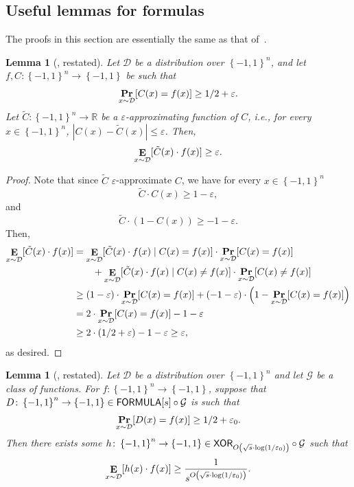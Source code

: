 \documentclass[10pt,a4paper]{article}
\newtheorem{lemma}[theorem]{Lemma}
\DeclareMathOperator*\Exp{{\bf E}}
\DeclareMathOperator*\Prob{{\bf Pr}}
\newcommand{\boolpm}{\left\{-1,1\right\}}
\newcommand{\FORMULA}{{\sf FORMULA}}
\newcommand{\XOR}{{\sf XOR}}
\newcommand{\given}{\mid}
\newcommand{\real}{\mathbb{R}}
\begin{document}
    \subsection{Useful lemmas for formulas}\label{subsec:formula-lemmas}
    
    The proofs in this section are essentially the same as that of~\cite{Tal16}.
    
    \begin{lemma}[\cite{Tal16},  restated]\label{lem:lb-Tal-1-app}
	    Let $\mathcal{D}$ be a distribution over $\boolpm^n$, and let $f,C\colon\boolpm^n\to\boolpm$ be such that
	    \[
	        \Prob_{x\sim\mathcal{D}}[C(x)=f(x)]\geq 1/2+\varepsilon.
	    \] 
	    Let $\tilde{C}\colon\boolpm^n\to\real$ be a $\varepsilon$-approximating function of $C$, i.e., for every $x\in\boolpm^n$, $|C(x)-\tilde{C}(x)|\leq \varepsilon$. Then,
	    \[
	        \Exp_{x\sim\mathcal{D}}[\tilde{C}(x)\cdot f(x)]\geq \varepsilon.
	    \]
	\end{lemma}
	
	\begin{proof}
		Note that since $\tilde{C}$ $\varepsilon$-approximate $C$, we have for every $x\in\boolpm^n$
		\[
			\tilde{C}\cdot C(x)\geq 1-\varepsilon,
		\]
		and 
		\[
			\tilde{C}\cdot (1-C(x))\geq -1-\varepsilon.
		\]
		Then,
		\begin{align*}
			\Exp_{x\sim\mathcal{D}}[\tilde{C}(x)\cdot f(x)]&=\Exp_{x\sim\mathcal{D}}[\tilde{C}(x)\cdot f(x)\given C(x)=f(x)]\cdot\Prob_{x\sim\mathcal{D}}[C(x)=f(x)]\\
			&\qquad+\Exp_{x\sim\mathcal{D}}[\tilde{C}(x)\cdot f(x)\given C(x)\ne f(x)]\cdot\Prob_{x\sim\mathcal{D}}[C(x)\ne f(x)]\\
			&\geq(1-\varepsilon)\cdot \Prob_{x\sim\mathcal{D}}[C(x)=f(x)] + (-1-\varepsilon)\cdot \left(1-\Prob_{x\sim\mathcal{D}}[C(x)=f(x)]\right)\\
			&=2\cdot \Prob_{x\sim\mathcal{D}}[C(x)=f(x)] - 1 -\varepsilon\\
			&\geq 2\cdot (1/2+\varepsilon) - 1 - \varepsilon \geq \varepsilon,
		\end{align*}
		as desired.
	\end{proof}
	
	\begin{lemma}[\cite{Tal16},  restated]\label{lem:lb-Tal-2-app}
	    Let $\mathcal{D}$ be a distribution over $\boolpm^n$ and let $\mathcal{G}$ be a class of functions. For $f\colon\boolpm^n\to\boolpm$, suppose that $D\colon\boolpm^n\to\boolpm\in \FORMULA[s]\circ\mathcal{G}$ is such that 
	    \[
	        \Prob_{x\sim\mathcal{D}}[D(x)=f(x)]\geq 1/2+\varepsilon_0.
	    \]
	    Then there exists some $h\colon\boolpm^n\to\boolpm\in \XOR_{O\left(\sqrt{s}\cdot\log(1/\varepsilon_0)\right)}\circ \mathcal{G}$ such that
	    \[
	        \Exp_{x\sim\mathcal{D}}[h(x)\cdot f(x)]\geq \frac{1}{s^{O\left(\sqrt{s}\cdot\log(1/\varepsilon_0)\right)}}.
	    \]
	\end{lemma}
	
\end{document}
